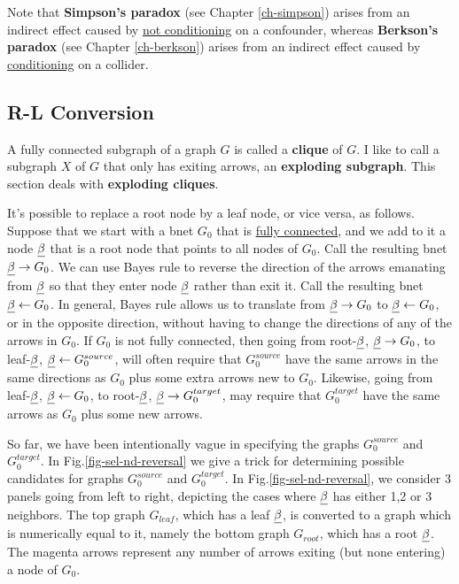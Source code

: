 Note that
{\bf Simpson's paradox} (see Chapter
\ref{ch-simpson}) arises from an indirect effect
caused by \ul{not conditioning}
on a confounder,
whereas
{\bf Berkson's paradox}
(see Chapter \ref{ch-berkson})
arises from an indirect effect
caused by \ul{conditioning}
on a collider.

\subsection{R-L Conversion}

A fully connected subgraph of 
a graph $G$ is called a 
{\bf clique} of $G$.
I like to call a subgraph $X$  of $G$ that only has exiting arrows, an 
{\bf exploding subgraph}.
This section deals with
 {\bf exploding cliques}.


It's possible to replace a root node
by a leaf node, or vice versa, as
follows.
Suppose that we start with
a bnet $G_0$ that is \ul{fully connected}, and
we add to it a node $\rvbeta$
that is a root node that points
to all nodes of $G_0$.
Call the resulting bnet $\rvbeta\rarrow G_0$.
We can use Bayes rule to reverse the direction
of the arrows emanating from $\rvbeta$
so that they enter node $\rvbeta$
rather than exit
it.
Call the resulting bnet $\rvbeta\larrow G_0$.
In general,
Bayes rule allows us to translate
from $\rvbeta\rarrow G_0$ to
$\rvbeta\larrow G_0$,
or in the opposite direction,
without having to change the
directions of any of the arrows in $G_0$.
If $G_0$ is not fully connected, then
going from root-$\rvbeta$,
$\rvbeta\rarrow G_0$, to leaf-$\rvbeta$,
$\rvbeta\larrow G_0^{source}$,
will often require that $G_0^{source}$
have the same arrows in the same
directions as $G_0$
plus some extra arrows
new to $G_0$.
Likewise, going
from leaf-$\rvbeta$, $\rvbeta\larrow G_0$, to root-$\rvbeta$,
$\rvbeta\rarrow G_0^{target}$,
may require that $G_0^{target}$ have
the same arrows as $G_0$ plus some new arrows.

So far, we have
been intentionally
vague in specifying the graphs
$G_0^{source}$ and $G_0^{target}$.
In Fig.\ref{fig-sel-nd-reversal}
we give a trick for determining
possible candidates for
graphs $G_0^{source}$ and $G_0^{target}$.
In
Fig.\ref{fig-sel-nd-reversal},
we consider 3 panels going from left
to right, depicting
the cases where $\rvbeta$ has either 1,2 or 3 neighbors.
The top graph
 $G_{leaf}$, which has
a leaf $\rvbeta$, is converted
to a graph which is numerically
equal to it, namely
the bottom
graph
 $G_{root}$, which has
a root $\rvbeta$.
The magenta arrows represent
any number of arrows
exiting (but none entering)
a node of $G_0$.

